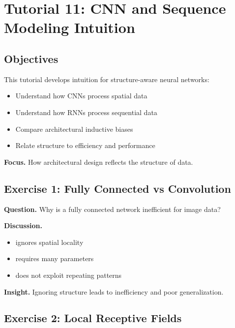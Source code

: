 \section{Tutorial 11: CNN and Sequence Modeling Intuition}

\subsection{Objectives}

This tutorial develops intuition for structure-aware neural networks:

\begin{itemize}
    \item Understand how CNNs process spatial data
    \item Understand how RNNs process sequential data
    \item Compare architectural inductive biases
    \item Relate structure to efficiency and performance
\end{itemize}

\medskip

\noindent
\textbf{Focus.}  
How architectural design reflects the structure of data.

\subsection{Exercise 1: Fully Connected vs Convolution}

\textbf{Question.}  
Why is a fully connected network inefficient for image data?

\medskip

\noindent
\textbf{Discussion.}

\begin{itemize}
    \item ignores spatial locality
    \item requires many parameters
    \item does not exploit repeating patterns
\end{itemize}

\medskip

\noindent
\textbf{Insight.}  
Ignoring structure leads to inefficiency and poor generalization.

\subsection{Exercise 2: Local Receptive Fields}

